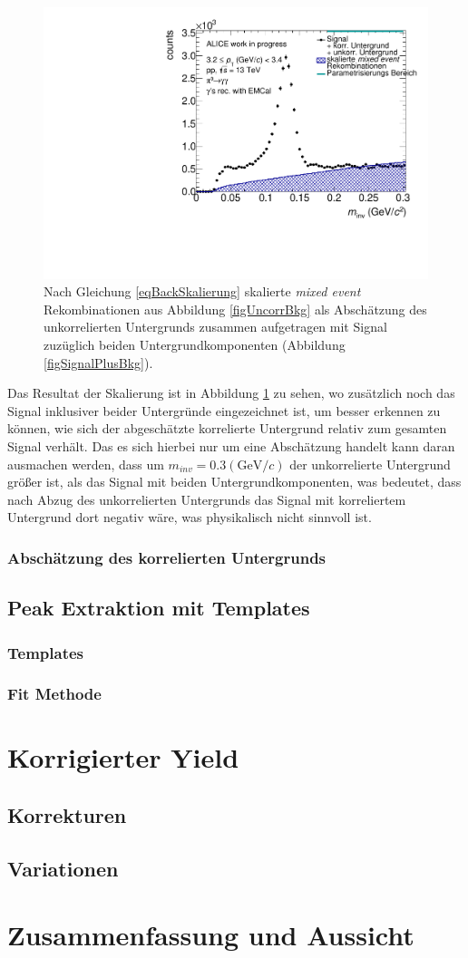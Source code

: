 \documentclass[]{article}
\begin{document}
	\begin{figure}[tbp]
		\centering
		\includegraphics[width=.7\linewidth]{hUncorrBkgNorm.pdf}
		\caption{Nach Gleichung \ref{eqBackSkalierung} skalierte {\it mixed event} Rekombinationen aus Abbildung \ref{figUncorrBkg} als Absch{\"a}tzung des unkorrelierten Untergrunds zusammen aufgetragen mit Signal zuz{\"u}glich beiden Untergrundkomponenten (Abbildung \ref{figSignalPlusBkg}).}
		\label{figUncorrBkgNorm}
	\end{figure}
	Das Resultat der Skalierung ist in Abbildung \ref{figUncorrBkgNorm} zu sehen, wo zus{\"a}tzlich noch das Signal inklusiver beider Untergr{\"u}nde eingezeichnet ist, um besser erkennen zu k{\"o}nnen, wie sich der abgesch{\"a}tzte korrelierte Untergrund relativ zum gesamten Signal verh{\"a}lt.
	Das es sich hierbei nur um eine Absch{\"a}tzung handelt kann daran ausmachen werden, dass um $m_{inv} = 0.3 (\text{GeV/}c)$ der unkorrelierte Untergrund gr{\"o}{\ss}er ist, als das Signal mit beiden Untergrundkomponenten, was bedeutet, dass nach Abzug des unkorrelierten Untergrunds das Signal mit korreliertem Untergrund dort negativ w{\"a}re, was physikalisch nicht sinnvoll ist.
	\subsubsection{Absch{\"a}tzung des korrelierten Untergrunds}
	\subsection{Peak Extraktion mit Templates}
	\subsubsection{Templates}
	\subsubsection{Fit Methode}
	\section{Korrigierter Yield}
	\subsection{Korrekturen}
	\subsection{Variationen}
	\section{Zusammenfassung und Aussicht}
\end{document}
